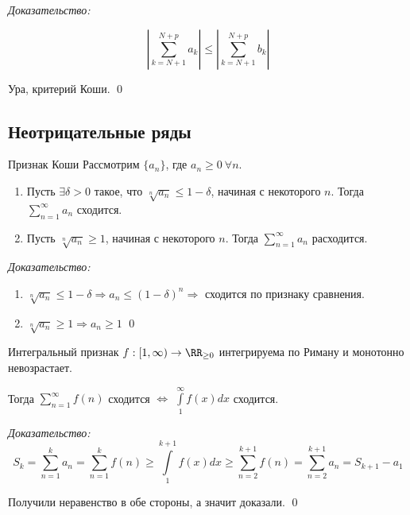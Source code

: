 \textit{Доказательство:}

\[
    \left| \sum\limits_{k = N + 1}^{N + p} a_k \right| \leq \left| \sum\limits_{k = N + 1}^{N + p} b_k \right|
\]

Ура, критерий Коши. \qed

\subsection{Неотрицательные ряды}

\begin{assrt}{Признак Коши}{}
    Рассмотрим \( \{ a_n \} \), где \( a_n \geq 0 \ \forall n \).
    \begin{enumerate}
        \item
            Пусть \( \exists \delta > 0 \) такое, что \( \sqrt[n]{a_n} \leq 1 - \delta \), начиная
            с некоторого \( n \). Тогда \( \sum\limits_{n = 1}^{\infty} a_n \) сходится.
        \item
            Пусть \( \sqrt[n]{a_n} \geq 1 \), начиная с некоторого \( n \).
            Тогда \( \sum\limits_{n = 1}^{\infty} a_n \) расходится.
    \end{enumerate}
\end{assrt}

\textit{Доказательство:}
\begin{enumerate}
    \item
        \( \sqrt[n]{a_n} \leq 1 - \delta \Rightarrow a_n \leq (1 - \delta)^n \Rightarrow \)
        сходится по признаку сравнения.
    \item
        \( \sqrt[n]{a_n} \geq 1 \Rightarrow a_n \geq 1 \)
\qed
\end{enumerate}

\begin{assrt}{Интегральный признак}{}
    \( f : [1, \infty) \to \RR_{\geq 0} \) интегрируема по Риману и монотонно невозрастает.

    Тогда \( \sum\limits_{n = 1}^{\infty} f(n) \) сходится
    \( \Leftrightarrow \)
    \( \int\limits_{1}^{\infty} f(x) dx \) сходится.
\end{assrt}

\textit{Доказательство:}
\[
    S_k
    =
    \sum\limits_{n = 1}^{k} a_n
    =
    \sum\limits_{n = 1}^{k} f(n)
    \geq
    \int\limits_{1}^{k + 1} f(x) dx
    \geq
    \sum\limits_{n = 2}^{k + 1} f(n)
    =
    \sum\limits_{n = 2}^{k + 1} a_n
    =
    S_{k + 1} - a_1
\]

Получили неравенство в обе стороны, а значит доказали. \qed

